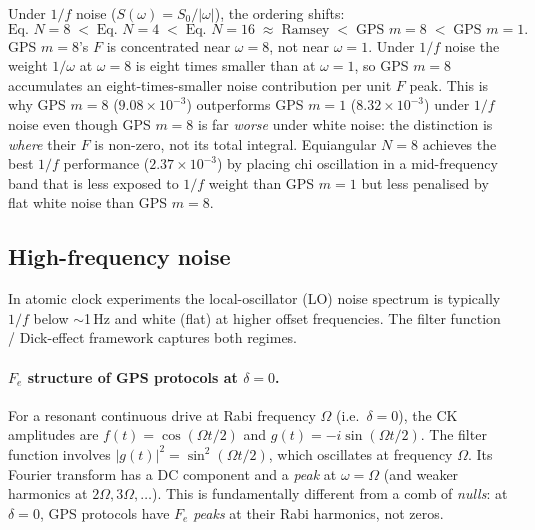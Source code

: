 \documentclass[12pt]{article}
\begin{document}
Under $1/f$ noise ($S(\omega) = S_0/|\omega|$), the ordering shifts:
\[
  \text{Eq. } N{=}8 \;<\; \text{Eq. } N{=}4 \;<\; \text{Eq. } N{=}16
  \;\approx\; \text{Ramsey} \;<\; \text{GPS }m{=}8 \;<\; \text{GPS }m{=}1.
\]
GPS $m=8$'s $F$ is concentrated near $\omega = 8$, not near $\omega = 1$.
Under $1/f$ noise the weight $1/\omega$ at $\omega = 8$ is
eight times smaller than at $\omega = 1$, so GPS $m=8$ accumulates an
eight-times-smaller noise contribution per unit $F$ peak.  This is why
GPS $m=8$ ($9.08\times10^{-3}$) outperforms GPS $m=1$ ($8.32\times10^{-3}$)
under $1/f$ noise even though GPS $m=8$ is far \emph{worse} under white noise:
the distinction is \emph{where} their $F$ is non-zero, not its total integral.
Equiangular $N{=}8$ achieves the best $1/f$ performance ($2.37\times10^{-3}$)
by placing chi oscillation in a mid-frequency band that is less exposed to $1/f$
weight than GPS $m=1$ but less penalised by flat white noise than GPS $m=8$.

\subsection*{High-frequency noise}

In atomic clock experiments the local-oscillator (LO) noise spectrum is
typically $1/f$ below $\sim$1\,Hz and white (flat) at higher offset frequencies.
The filter function / Dick-effect framework captures both regimes.

\paragraph{$F_e$ structure of GPS protocols at $\delta = 0$.}
For a resonant continuous drive at Rabi frequency $\Omega$ (i.e.\ $\delta = 0$),
the CK amplitudes are $f(t) = \cos(\Omega t/2)$ and $g(t) = -i\sin(\Omega t/2)$.
The filter function involves $|g(t)|^2 = \sin^2(\Omega t/2)$, which oscillates
at frequency $\Omega$.  Its Fourier transform has a DC component and a
\emph{peak} at $\omega = \Omega$ (and weaker harmonics at $2\Omega, 3\Omega,\ldots$).
This is fundamentally different from a comb of \emph{nulls}: at $\delta = 0$,
GPS protocols have $F_e$ \emph{peaks} at their Rabi harmonics, not zeros.
\end{document}

